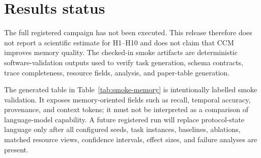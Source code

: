 \section{Results status}

The full registered campaign has not been executed. This release therefore does not report a scientific estimate for H1--H10 and does not claim that CCM improves memory quality. The checked-in smoke artifacts are deterministic software-validation outputs used to verify task generation, schema contracts, trace completeness, resource fields, analysis, and paper-table generation.

The generated table in Table~\ref{tab:smoke-memory} is intentionally labelled smoke validation. It exposes memory-oriented fields such as recall, temporal accuracy, provenance, and context tokens; it must not be interpreted as a comparison of language-model capability. A future registered run will replace protocol-state language only after all configured seeds, task instances, baselines, ablations, matched resource views, confidence intervals, effect sizes, and failure analyses are present.

\begin{table}[t]
\centering
\caption{Deterministic smoke-validation schema. Values are generated from the checked-in symbolic adapter and are not scientific campaign results.}
\label{tab:smoke-memory}

\end{table}
